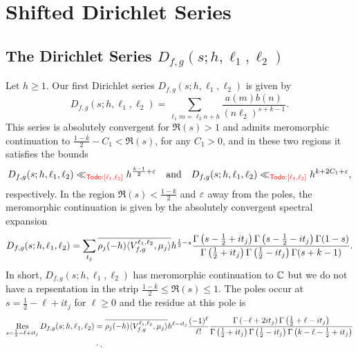 \documentclass[12pt,reqno,oneside]{amsart}
\begin{document}
\section{Shifted Dirichlet Series}
  \subsection*{The Dirichlet Series \texorpdfstring{$D_{f,g}(s;h,\ell_{1},\ell_{2})$}{}}
    Let $h \ge 1$. Our first Dirichlet series $D_{f,g}(s;h,\ell_{1},\ell_{2})$ is given by
    \[
      D_{f,g}(s;h,\ell_{1},\ell_{2}) = \sum_{\ell_{1}m = \ell_{2}n+h}\frac{a(m)b(n)}{(n\ell_{2})^{s+k-1}}.
    \]
    This series is absolutely convergent for $\Re(s) > 1$ and admits meromorphic continuation to $\frac{1-k}{2}-C_{1} < \Re(s)$, for any $C_{1} > 0$, and in these two regions it satisfies the bounds
    \[
      D_{f,g}(s;h,\ell_{1},\ell_{2}) \ll_{\textcolor{red}{\sf Todo: [\ell_{1},\ell_{2}]}} h^{\frac{k-1}{2}+\varepsilon} \quad \text{and} \quad D_{f,g}(s;h,\ell_{1},\ell_{2}) \ll_{\textcolor{red}{\sf Todo: [\ell_{1},\ell_{2}]}} h^{k+2C_{1}+\varepsilon},
    \]
    respectively. In the region $\Re(s) < \frac{1-k}{2}$ and $\varepsilon$ away from the poles, the meromorphic continuation is given by the absolutely convergent spectral expansion
    \[
      D_{f,g}(s;h,\ell_{1},\ell_{2}) = \sum_{t_{j}}\overline{\rho_{j}(-h)\langle V_{f,g}^{\ell_{1},\ell_{2}},\mu_{j}\rangle}h^{\frac{1}{2}-s}\frac{\Gamma\left(s-\frac{1}{2}+it_{j}\right)\Gamma\left(s-\frac{1}{2}-it_{j}\right)\Gamma(1-s)}{\Gamma\left(\frac{1}{2}+it_{j}\right)\Gamma\left(\frac{1}{2}-it_{j}\right)\Gamma(s+k-1)}.
    \]
    In short, $D_{f,g}(s;h,\ell_{1},\ell_{2})$ has meromorphic continuation to $\mathbb{C}$ but we do not have a repsentation in the strip $\frac{1-k}{2} \le \Re(s) \le 1$. The poles occur at $s = \frac{1}{2}-\ell+it_{j}$ for $\ell \ge 0$ and the residue at this pole is
    \begin{align*}
      \operatorname*{\mathrm{Res}}_{s = \frac{1}{2}-\ell+it_{j}}D_{f,g}(s;h,\ell_{1},\ell_{2}) &= \overline{\rho_{j}(-h)\langle V_{f,g}^{\ell_{1},\ell_{2}},\mu_{j}\rangle}h^{\ell-it_{j}}\frac{(-1)^{\ell}}{\ell!}\frac{\Gamma\left(-\ell+2it_{j}\right)\Gamma\left(\frac{1}{2}+\ell-it_{j}\right)}{\Gamma\left(\frac{1}{2}+it_{j}\right)\Gamma\left(\frac{1}{2}-it_{j}\right)\Gamma\left(k-\ell-\frac{1}{2}+it_{j}\right)} \\
      &\cdot .
    \end{align*}
\end{document}
